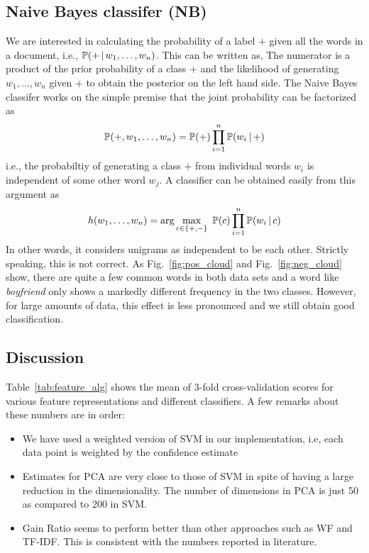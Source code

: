 \documentclass[11pt, letterpaper, conference, final, twocolumn]{ieeeconf}
\begin{document}
\subsection{Naive Bayes classifer (NB)}
\label{ssec:naive_bayes}
%
We are interested in calculating the probability of a label $+$ given all the words in a document, i.e., $\mathbb{P}(+ \, \vert \, w_1, \ldots, w_n)$. This can be written as,
The numerator is a product of the prior probability of a class $+$ and the likelihood of generating $w_1, \ldots, w_n$ given $+$ to obtain the posterior on the left hand side. The Naive Bayes classifer works on the simple premise that the joint probability can be factorized as
$$
\mathbb{P}(+, w_1, \ldots, w_n) = \mathbb{P}(+) \prod_{i=1}^n \mathbb{P}(w_i \, \vert \, +)
$$
i.e., the probabiltiy of generating a class $+$ from individual words $w_i$ is independent of some other word $w_j$. A classifier can be obtained easily from this argument as
$$
h(w_1, \ldots, w_n) = \arg \max_{c \in \{ +, - \} }\ \mathbb{P}(c) \prod_{i=1}^n \mathbb{P}(w_i \, \vert \, c)
$$
%
In other words, it considers unigrams as independent to be each other. Strictly speaking, this is not correct. As Fig.~\ref{fig:pos_cloud} and Fig.~\ref{fig:neg_cloud} show, there are quite a few common words in both data sets and a word like \emph{boyfriend} only shows a markedly different frequency in the two classes. However, for large amounts of data, this effect is less pronounced and we still obtain good classification.

\subsection{Discussion}
\label{ssec:discussion}

Table~\ref{tab:feature_alg} shows the mean of $3$-fold cross-validation scores for various feature representations and different classifiers. A few remarks about these numbers are in order:

\begin{itemize}
\item We have used a weighted version of SVM in our implementation, i.e, each data point is weighted by the confidence estimate
\item Estimates for PCA are very close to those of SVM in spite of having a large reduction in the dimensionality. The number of dimensions in PCA is just 50 as compared to 200 in SVM.
\item Gain Ratio seems to perform better than other approaches such as WF and TF-IDF. This is consistent with the numbers reported in literature.
\end{itemize}
\end{document}
